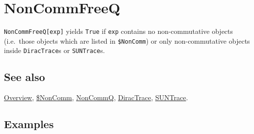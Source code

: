 \documentclass[../FeynCalcManual.tex]{subfiles}
\begin{document}
\hypertarget{noncommfreeq}{
\section{NonCommFreeQ}\label{noncommfreeq}}

\texttt{NonCommFreeQ[\allowbreak{}exp]} yields \texttt{True} if
\texttt{exp} contains no non-commutative objects (i.e.~those objects
which are listed in \texttt{\$NonComm}) or only non-commutative objects
inside \texttt{DiracTrace}s or \texttt{SUNTrace}s.

\subsection{See also}

\hyperlink{toc}{Overview}, \hyperlink{dollarnoncomm}{\$NonComm},
\hyperlink{noncommq}{NonCommQ}, \hyperlink{diractrace}{DiracTrace},
\hyperlink{suntrace}{SUNTrace}.

\subsection{Examples}
\end{document}
